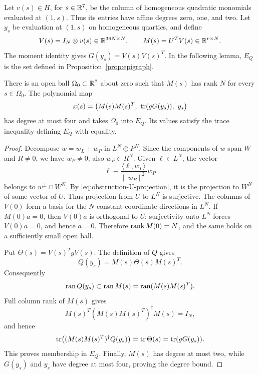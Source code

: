 Let $v(s)\in H$, for $s\in\mathbb R^7$, be the column of homogeneous quadratic
monomials evaluated at $(1,s)$.  Thus its entries have affine degrees zero,
one, and two.  Let $y_s$ be evaluation at $(1,s)$ on homogeneous quartics,
and define
\begin{equation}
 \label{eq:patch-matrices}
 V(s)=I_N\otimes v(s)\in\mathbb R^{36N\times N},\qquad
 M(s)=U^TV(s)\in\mathbb R^{r\times N}.
\end{equation}
The moment identity gives $G(y_s)=V(s)V(s)^T$.  In the following lemma,
$E_Q$ is the set defined in Proposition~\ref{prop:epigraph}.

\begin{lemma}
 \label{lem:polynomial-patch}
There is an open ball $\Omega_0\subset\mathbb R^7$ about zero such that $M(s)$
has rank $N$ for every $s\in\Omega_0$.  The polynomial map
\begin{equation}
 \label{eq:polynomial-patch}
 x(s)=\bigl(M(s)M(s)^T,\ \operatorname{tr}(gG(y_s)),\ y_s\bigr)
\end{equation}
has degree at most four and takes $\Omega_0$ into $E_Q$.  Its values satisfy
the trace inequality defining $E_Q$ with equality.
\end{lemma}

\begin{proof}
Decompose $w=w_L+w_P$ in $L^N\oplus P^N$.  Since the components of $w$
span $W$ and $R\ne0$, we have $w_P\ne0$; also $w_P\in R^N$.  Given
$\ell\in L^N$, the vector
\[
 \ell-\frac{\langle\ell,w_L\rangle}{\|w_P\|^2}w_P
\]
belongs to $w^\perp\cap W^N$.  By
\eqref{eq:obstruction-U-projection}, it is the projection to $W^N$ of
some vector of $U$.  Thus projection from $U$ to $L^N$ is surjective.
The columns of $V(0)$ form a basis for the $N$ constant-coordinate
directions in $L^N$.  If $M(0)a=0$, then $V(0)a$ is orthogonal to $U$;
surjectivity onto $L^N$ forces $V(0)a=0$, and hence $a=0$.  Therefore
$\operatorname{rank} M(0)=N$, and the same holds on a sufficiently small open ball.

Put $\Theta(s)=V(s)^TgV(s)$.  The definition of $Q$ gives
\[
 Q(y_s)=M(s)\Theta(s)M(s)^T.
\]
Consequently
\[
 \operatorname{ran} Q(y_s)\subset\operatorname{ran} M(s)=\operatorname{ran}(M(s)M(s)^T).
\]
Full column rank of $M(s)$ gives
\[
 M(s)^T(M(s)M(s)^T)^\dagger M(s)=I_N,
\]
and hence
\[
 \operatorname{tr}\bigl((M(s)M(s)^T)^\dagger Q(y_s)\bigr)
 =\operatorname{tr}\Theta(s)=\operatorname{tr}(gG(y_s)).
\]
This proves membership in $E_Q$.  Finally, $M(s)$ has degree at most two,
while $G(y_s)$ and $y_s$ have degree at most four, proving the degree
bound.
\end{proof}

